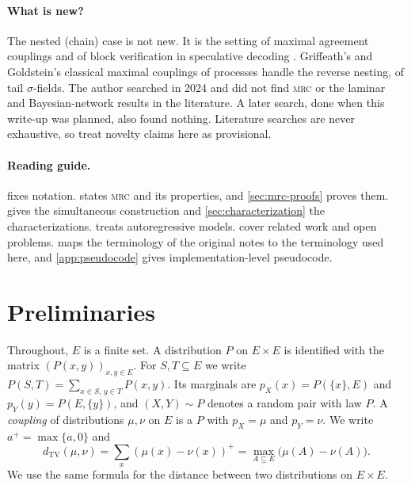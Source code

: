 \documentclass[11pt]{article}
\theoremstyle{definition}
\newcommand{\pX}{p_X}
\newcommand{\pY}{p_Y}
\newcommand{\TV}{d_{\mathrm{TV}}}
\newcommand{\pos}[1]{\left(#1\right)^{+}}
\newcommand{\MRC}{\textnormal{\textsc{mrc}}}
\begin{document}
\paragraph{What is new?}
The nested (chain) case is not new. It is the setting of maximal agreement
couplings \cite{vollering2016maximal,ernst2019mexit} and of block verification
in speculative decoding \cite{sun2024block}. Griffeath's and Goldstein's
classical maximal couplings of processes \cite{griffeath1975maximal,goldstein1979maximal}
handle the reverse nesting, of tail $\sigma$-fields. The author searched in
2024 and did not find \MRC{} or the laminar and Bayesian-network results in the
literature. A later search, done when this write-up was planned, also found
nothing. Literature searches are never exhaustive, so treat novelty claims here
as provisional.

\paragraph{Reading guide.}
 fixes notation.  states \MRC{} and its
properties, and \cref{sec:mrc-proofs} proves them.  gives the
simultaneous construction and \cref{sec:characterization} the
characterizations.  treats autoregressive models.
 cover related work and open problems.
 maps the terminology of the original notes to the
terminology used here, and \cref{app:pseudocode} gives implementation-level
pseudocode.

\section{Preliminaries}\label{sec:prelim}

Throughout, $E$ is a finite set. A distribution $P$ on $E\times E$ is identified
with the matrix $(P(x,y))_{x,y\in E}$. For $S,T\subseteq E$ we write
$P(S,T)=\sum_{x\in S,\,y\in T}P(x,y)$. Its marginals are
$\pX(x)=P(\{x\},E)$ and $\pY(y)=P(E,\{y\})$, and $(X,Y)\sim P$ denotes a random
pair with law $P$. A \emph{coupling} of distributions $\mu,\nu$ on $E$ is a $P$
with $\pX=\mu$ and $\pY=\nu$. We write $a^+=\max\{a,0\}$ and
\[
  \TV(\mu,\nu)=\sum_{x}\pos{\mu(x)-\nu(x)}=\max_{A\subseteq E}\bigl(\mu(A)-\nu(A)\bigr).
\]
We use the same formula for the distance between two distributions on
$E\times E$.
\end{document}
